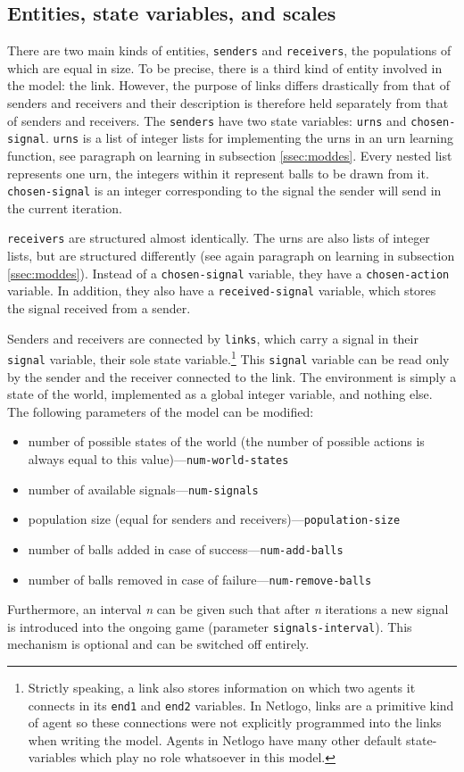 \documentclass[
	DIV=calc,
	BCOR=0mm,
	pagesize,
	titlepage
]{scrartcl}
\newcommand{\code}[1]{\texttt{#1}}
\newcommand{\dash}{—}
\begin{document}
\subsection{Entities, state variables, and scales}
\label{ssec:modent}
There are two main kinds of entities, \code{senders} and \code{receivers}, the populations of which are equal in size.
To be precise, there is a third kind of entity involved in the model: the link.
However, the purpose of links differs drastically from that of senders and receivers and their description is therefore held separately from that of senders and receivers.
The \code{senders} have two state variables: \code{urns} and \code{chosen-signal}.
\code{urns} is a list of integer lists for implementing the urns in an urn learning function, see paragraph on learning in subsection \ref{ssec:moddes}.
Every nested list represents one urn, the integers within it represent balls to be drawn from it.
\code{chosen-signal} is an integer corresponding to the signal the sender will send in the current iteration.

\code{receivers} are structured almost identically.
The urns are also lists of integer lists, but are structured differently (see again paragraph on learning in subsection \ref{ssec:moddes}).
Instead of a \code{chosen-signal} variable, they have a \code{chosen-action} variable.
In addition, they also have a \code{received-signal} variable, which stores the signal received from a sender.

Senders and receivers are connected by \code{links}, which carry a signal in their \code{signal} variable, their sole state variable.\footnote{Strictly speaking, a link also stores information on which two agents it connects in its \code{end1} and \code{end2} variables. In Netlogo, links are a primitive kind of agent so these connections were not explicitly programmed into the links when writing the model. Agents in Netlogo have many other default state-variables which play no role whatsoever in this model.}
This \code{signal} variable can be read only by the sender and the receiver connected to the link.
The environment is simply a state of the world, implemented as a global integer variable, and nothing else.
The following parameters of the model can be modified:
\begin{itemize}
	\item number of possible states of the world (the number of possible actions is always equal to this value)\dash \code{num-world-states}
	\item number of available signals\dash \code{num-signals}
	\item population size (equal for senders and receivers)\dash \code{population-size}
	\item number of balls added in case of success\dash \code{num-add-balls}
	\item number of balls removed in case of failure\dash \code{num-remove-balls}
\end{itemize}
Furthermore, an interval \textit{n} can be given such that after \textit{n} iterations a new signal is introduced into the ongoing game (parameter \code{signals-interval}).
This mechanism is optional and can be switched off entirely.
\end{document}
